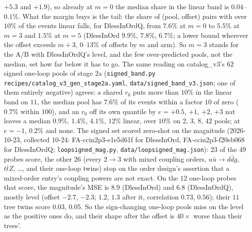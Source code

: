 \documentclass[11pt]{article}
\newcommand{\code}[1]{\texttt{#1}}
\begin{document}
$+5.3$ and $+1.9$), so already at $m=0$ the median share in the linear band is $0.04$--$0.1\%$. What the margin buys is
the tail: the share of (pool, offset) pairs with over $10\%$ of the events linear falls, for DlessInOrdQ, from $7.6\%$
at $m=0$ to $5.5\%$ at $m=3$ and $1.5\%$ at $m=5$ (DlessInOrd $9.9\%$, $7.8\%$, $6.7\%$; a lower bound wherever the
offset exceeds $m+3$, $0$--$13\%$ of offsets by $m$ and arm). So $m=3$ stands for the A/B with DlessInOrdQ's level, and the few
over-predicted pools, not the median, set how far below it has to go. The same reading on catalog\_v3's $62$ signed one-loop pools of stage 2a
(\code{signed\_band.py recipes/catalog\_v3\_gen\_stage2a.yaml}, \code{data/signed\_band\_v3.json}; one of them
entirely negative) agrees: a shared $r_0$ puts more than $10\%$ in the linear band on $11$, the median pool has $7.6\%$
of its events within a factor $10$ of zero ($0.7\%$ within $100$), and an $r_0$ off its own quantile by $e=+0.5$, $+1$,
$+2$, $+3$ nat leaves a median $0.9\%$, $1.4\%$, $4.1\%$, $12\%$ linear, over $10\%$ on $2$, $3$, $8$, $42$ pools; at
$e=-1$, $0.2\%$ and none. The signed set scored zero-shot on the magnitude (2026-10-23, collected 10-24: FA-ccin2p3-e1e5d61f for
DlessInOrd, FA-ccin2p3-f20eb068 for DlessInOrdQ; \code{loopsigned\_mag.py}, \code{data/loopsigned\_mag.json}): $23$
of the $49$ probes score, the other $26$ (every $2\to3$ with mixed coupling orders, $u\bar u\to d\bar dg$, $t\bar tZ$,
\dots, and their one-loop twins) stop on the order design's assertion that a mixed-order entry's coupling powers are
not exact. On the $12$ one-loop probes that score, the magnitude's MSE is $8.9$ (DlessInOrd) and $6.8$ (DlessInOrdQ),
mostly level (offset $-2.7$, $-2.3$; $1.2$, $1.3$ after it, correlation $0.73$, $0.56$); their $11$ tree twins score
$0.03$, $0.05$. So the sign-changing one-loop pools miss on the level as the positive ones do, and their shape after
the offset is $40\times$ worse than their trees'.
\end{document}
